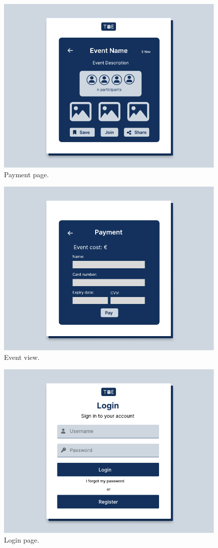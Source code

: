 \documentclass[9pt]{extarticle}
\begin{document}
\begin{figure}[!htb]
	\centering
	\includegraphics[width=.7\linewidth]{./images/EventView.pdf}
	\caption{Payment page.}
	\label{fig:eventView}
\end{figure}

\begin{figure}[!htb]
	\centering
	\includegraphics[width=.7\linewidth]{./images/PaymentPage.pdf}
	\caption{Event view.}
	\label{fig:paymentPage}
\end{figure}


\begin{figure}[!htb]
	\centering
	\includegraphics[width=.7\linewidth]{./images/Login.pdf}
	\caption{Login page.}
	\label{fig:login}
\end{figure}
\end{document}

